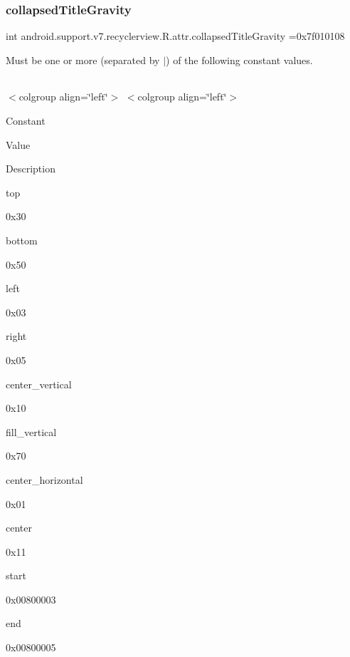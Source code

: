 \subsubsection{\texorpdfstring{collapsed\+Title\+Gravity}{collapsedTitleGravity}}
{\footnotesize\ttfamily int android.\+support.\+v7.\+recyclerview.\+R.\+attr.\+collapsed\+Title\+Gravity =0x7f010108\hspace{0.3cm}{\ttfamily [static]}}

Must be one or more (separated by \textquotesingle{}$\vert$\textquotesingle{}) of the following constant values.

\tabulinesep=1mm
\begin{longtabu} spread 0pt [c]{*{0}{|X[-1]}|}
\hline
\end{longtabu}
$<$colgroup align=\char`\"{}left\char`\"{}$>$ $<$colgroup align=\char`\"{}left\char`\"{}$>$ 

Constant

Value

Description 

{\ttfamily top}

0x30

{\ttfamily bottom}

0x50

{\ttfamily left}

0x03

{\ttfamily right}

0x05

{\ttfamily center\+\_\+vertical}

0x10

{\ttfamily fill\+\_\+vertical}

0x70

{\ttfamily center\+\_\+horizontal}

0x01

{\ttfamily center}

0x11

{\ttfamily start}

0x00800003

{\ttfamily end}

0x00800005\mbox{\label{classandroid_1_1support_1_1v7_1_1recyclerview_1_1R_1_1attr_a13db686506a7e89fffa5db487b138abb}} 
